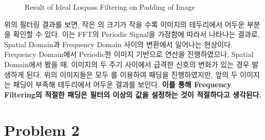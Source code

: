 \documentclass{report}
\begin{document}
\begin{figure}[htbp]
    \centering

    \hspace{1pt}
    \hspace{1pt}

    \caption{Result of Ideal Lospass Filtering on Padding of Image}
\end{figure}


위의 필터링 결과를 보면, 작은 의 크기가 작을 수록 이미지의 테두리에서 어두운 부분을 확인할 수 있다.
이는 FFT의 Periodic Signal을 가정함에 따라서 나타나는 결과로, Spatial Domain과 Frequency Domain 사이의 변환에서 일어나는 현상이다.
Frequency Domain에서 Periodic한 이미지 기반으로 연산을 진행하였으나, Spatial Domain에서 봤을 때, 이미지의 두 주기 사이에서 급격한 신호의 변화가 있는 경우 발생하게 된다.
위의 이미지들은 모두 를 이용하여 패딩을 진행하였지만, 앞의 두 이미지는 패딩이 부족해 테두리에서 어두운 결과를 보인다.
\textbf{이를 통해 Frequency Filtering의 적절한 패딩은 필터의  이상의 값을 설정하는 것이 적절하다고 생각된다.}

\section*{Problem 2}
\end{document}
